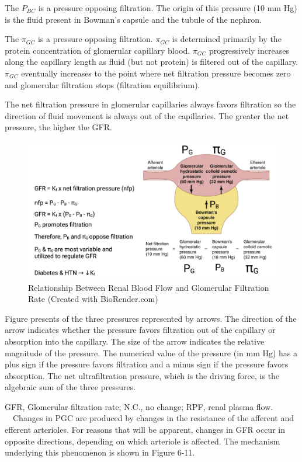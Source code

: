 The $P_{BC}$ is a pressure opposing filtration. The origin of this pressure (10 mm Hg) is the fluid present in Bowman’s capsule and the tubule of the nephron.

The $\pi_{GC}$ is a pressure opposing filtration. $\pi_{GC}$ is determined primarily by the protein concentration of glomerular capillary blood. $\pi_{GC}$ progressively increases along the capillary length as fluid (but not protein) is filtered out of the capillary. $\pi_{GC}$ eventually increases to the point where net filtration pressure becomes zero and glomerular filtration stops (filtration equilibrium). 

The net filtration pressure in glomerular capillaries always favors filtration so the direction of fluid movement is always out of the capillaries. The greater the net pressure, the higher the GFR.


\begin{figure}[!h]
    \centering
    \includegraphics[width=1\linewidth]{./figure/RBF_GFR.png}
    \caption{Relationship Between Renal Blood Flow and Glomerular Filtration Rate \footnotesize{(Created with BioRender.com)}}
    \label{fig:RBF_GFR}
\end{figure}

Figure presents of the three pressures represented by arrows. The direction of the arrow indicates whether the pressure favors filtration out of the capillary or absorption into the capillary. The size of the arrow indicates the relative magnitude of the pressure. The numerical value of the pressure (in mm Hg) has a plus sign if the pressure favors filtration and a minus sign if the pressure favors absorption. The net ultrafiltration pressure, which is the driving force, is the algebraic sum of the three pressures.

GFR, Glomerular filtration rate; N.C., no change; RPF, renal plasma flow.   Changes in PGC are produced by changes in the resistance of the afferent and efferent arterioles. For reasons that will be apparent, changes in GFR occur in opposite directions, depending on which arteriole is affected. The mechanism underlying this phenomenon is shown in Figure 6-11.

